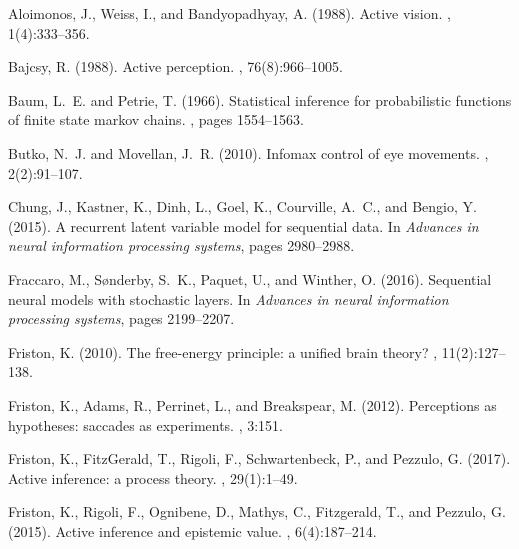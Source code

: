 \documentclass[12pt,twoside,openright]{article}
\begin{document}

\begin{thebibliography}{}
	
	Aloimonos, J., Weiss, I., and Bandyopadhyay, A. (1988).
	\newblock Active vision.
	, 1(4):333--356.
	
	Bajcsy, R. (1988).
	\newblock Active perception.
	, 76(8):966--1005.
	
	Baum, L.~E. and Petrie, T. (1966).
	\newblock Statistical inference for probabilistic functions of finite state
	markov chains.
	, pages 1554--1563.
	
	Butko, N.~J. and Movellan, J.~R. (2010).
	\newblock Infomax control of eye movements.
	,
	2(2):91--107.
	
	Chung, J., Kastner, K., Dinh, L., Goel, K., Courville, A.~C., and Bengio, Y.
	(2015).
	\newblock A recurrent latent variable model for sequential data.
	\newblock In {\em Advances in neural information processing systems}, pages
	2980--2988.
	
	Fraccaro, M., S{\o}nderby, S.~K., Paquet, U., and Winther, O. (2016).
	\newblock Sequential neural models with stochastic layers.
	\newblock In {\em Advances in neural information processing systems}, pages
	2199--2207.
	
	Friston, K. (2010).
	\newblock The free-energy principle: a unified brain theory?
	, 11(2):127--138.
	
	Friston, K., Adams, R., Perrinet, L., and Breakspear, M. (2012).
	\newblock Perceptions as hypotheses: saccades as experiments.
	, 3:151.
	
	Friston, K., FitzGerald, T., Rigoli, F., Schwartenbeck, P., and Pezzulo, G.
	(2017).
	\newblock Active inference: a process theory.
	, 29(1):1--49.
	
	Friston, K., Rigoli, F., Ognibene, D., Mathys, C., Fitzgerald, T., and Pezzulo,
	G. (2015).
	\newblock Active inference and epistemic value.
	, 6(4):187--214.
	

\end{thebibliography}
\end{document}
